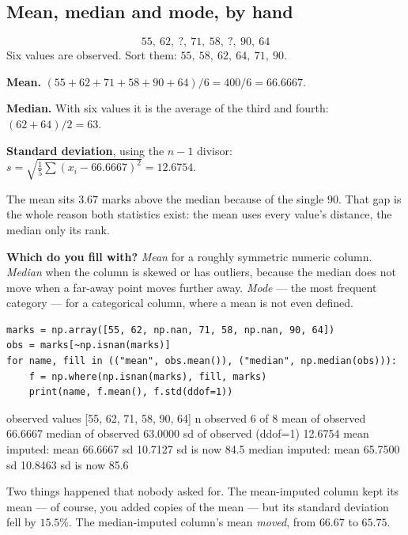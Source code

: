 \documentclass[11pt]{article}
\begin{document}
\subsection{Mean, median and mode, by hand}

\begin{worked}
\[
  55,\ 62,\ ?,\ 71,\ 58,\ ?,\ 90,\ 64
\]
Six values are observed. Sort them: $55,\ 58,\ 62,\ 64,\ 71,\ 90$.

\medskip
\textbf{Mean.} $(55+62+71+58+90+64)/6 = 400/6 = 66.6667$.

\textbf{Median.} With six values it is the average of the third and fourth:
$(62+64)/2 = 63$.

\textbf{Standard deviation}, using the $n-1$ divisor:
$s = \sqrt{\frac{1}{5}\sum(x_i - 66.6667)^2} = 12.6754$.

\medskip
The mean sits $3.67$ marks above the median because of the single $90$. That
gap is the whole reason both statistics exist: the mean uses every value's
distance, the median only its rank.

\medskip
\textbf{Which do you fill with?} \emph{Mean} for a roughly symmetric numeric
column. \emph{Median} when the column is skewed or has outliers, because the
median does not move when a far-away point moves further away. \emph{Mode} ---
the most frequent category --- for a categorical column, where a mean is not
even defined.
\end{worked}

\begin{lstlisting}
marks = np.array([55, 62, np.nan, 71, 58, np.nan, 90, 64])
obs = marks[~np.isnan(marks)]
for name, fill in (("mean", obs.mean()), ("median", np.median(obs))):
    f = np.where(np.isnan(marks), fill, marks)
    print(name, f.mean(), f.std(ddof=1))
\end{lstlisting}
\begin{codeout}
observed values       [55, 62, 71, 58, 90, 64]
n observed 6 of 8
mean of observed         66.6667
median of observed       63.0000
sd of observed (ddof=1)  12.6754
mean   imputed:  mean 66.6667   sd 10.7127   sd is now 84.5%
median imputed:  mean 65.7500   sd 10.8463   sd is now 85.6%
\end{codeout}

Two things happened that nobody asked for. The mean-imputed column kept its
mean --- of course, you added copies of the mean --- but its standard deviation
fell by $15.5\%$. The median-imputed column's mean \emph{moved}, from $66.67$
to $65.75$.
\end{document}
